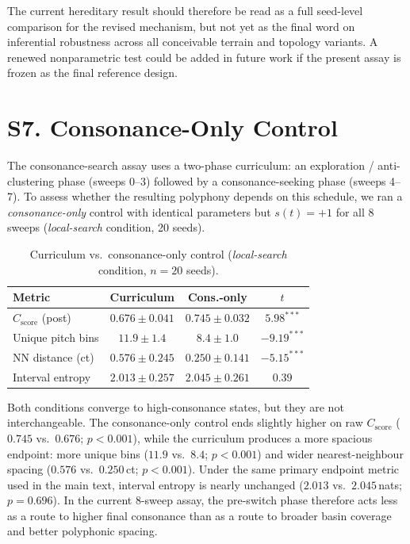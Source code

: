 \documentclass[letterpaper]{article}
\begin{document}
The current hereditary result should therefore be read as a full seed-level comparison for the revised mechanism, but not yet as the final word on inferential robustness across all conceivable terrain and topology variants. A renewed nonparametric test could be added in future work if the present assay is frozen as the final reference design.

\section{S7. Consonance-Only Control}

The consonance-search assay uses a two-phase curriculum: an exploration / anti-clustering phase (sweeps 0--3) followed by a consonance-seeking phase (sweeps 4--7). To assess whether the resulting polyphony depends on this schedule, we ran a \emph{consonance-only} control with identical parameters but $s(t) = +1$ for all 8 sweeps (\emph{local-search} condition, 20 seeds).

\begin{table}[h]
\centering
\caption{Curriculum vs.\ consonance-only control (\emph{local-search} condition, $n\!=\!20$ seeds).}
\label{tab:consonly}
\footnotesize
{\setlength{\tabcolsep}{4pt}
\begin{tabular}{@{}lccc@{}}
\toprule
\textbf{Metric} & \textbf{Curriculum} & \textbf{Cons.-only} & $t$ \\
\midrule
$C_{\text{score}}$ (post) & $0.676 \pm 0.041$ & $0.745 \pm 0.032$ & $5.98^{***}$ \\
Unique pitch bins & $11.9 \pm 1.4$ & $8.4 \pm 1.0$ & $-9.19^{***}$ \\
NN distance (ct) & $0.576 \pm 0.245$ & $0.250 \pm 0.141$ & $-5.15^{***}$ \\
Interval entropy & $2.013 \pm 0.257$ & $2.045 \pm 0.261$ & $0.39$ \\
\bottomrule
\end{tabular}
}
\end{table}

Both conditions converge to high-consonance states, but they are not interchangeable. The consonance-only control ends slightly higher on raw $C_{\text{score}}$ ($0.745$ vs.\ $0.676$; $p < 0.001$), while the curriculum produces a more spacious endpoint: more unique bins ($11.9$ vs.\ $8.4$; $p < 0.001$) and wider nearest-neighbour spacing ($0.576$ vs.\ $0.250$\,ct; $p < 0.001$). Under the same primary endpoint metric used in the main text, interval entropy is nearly unchanged ($2.013$ vs.\ $2.045$\,nats; $p = 0.696$). In the current 8-sweep assay, the pre-switch phase therefore acts less as a route to higher final consonance than as a route to broader basin coverage and better polyphonic spacing.
\end{document}

